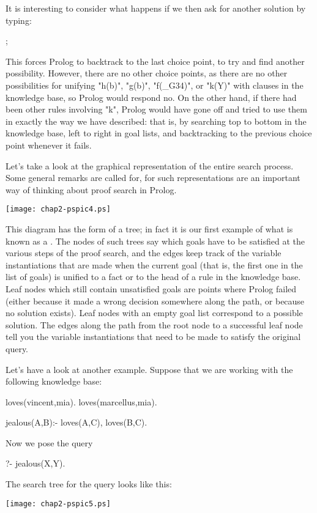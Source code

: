 It is interesting to consider what happens if we then ask for another
solution by typing:
\begin{LPNcodedisplay}
;
\end{LPNcodedisplay}
This forces Prolog to backtrack to the last choice point, to try and
find another possibility. However, there are no other choice points, as
there are no other possibilities for unifying "h(b)", "g(b)",
"f(\_G34)", or "k(Y)" with clauses in the knowledge base, so Prolog
would respond no.  On the other hand, if there had been other rules
involving "k", Prolog would have gone off and tried to use them in
exactly the way we have described: that is, by searching top to bottom
in the knowledge base, left to right in goal lists, and backtracking
to the previous choice point whenever it fails.


Let's take a look at the graphical representation of the entire search
process. Some general remarks are called for, for such representations
are an important way of thinking about proof search in Prolog.
%
\begin{center}
\texttt{[image: chap2-pspic4.ps]}
\end{center}
This diagram has the form of a tree; in fact it is our first example
of what is known as a .  The nodes of such trees
say which goals have to be satisfied at the various steps of the proof
search, and the edges keep track of the variable instantiations that
are made when the current goal (that is, the first one in the list of
goals) is unified to a fact or to the head of a rule in the knowledge
base.  Leaf nodes which still contain unsatisfied goals are points
where Prolog failed (either because it made a wrong decision somewhere
along the path, or because no solution exists). Leaf nodes with an
empty goal list correspond to a possible solution.  The edges along
the path from the root node to a successful leaf node tell you the
variable instantiations that need to be made to satisfy the original
query.

Let's have a look at another example. Suppose that we are working with
the following knowledge base:
\begin{LPNcodedisplay}
loves(vincent,mia).
loves(marcellus,mia).

jealous(A,B):- loves(A,C), loves(B,C).
\end{LPNcodedisplay}
%
Now we pose the query
\begin{LPNcodedisplay}
?- jealous(X,Y).
\end{LPNcodedisplay}
%
The search tree for the query looks like this:
%
\begin{center}
\texttt{[image: chap2-pspic5.ps]}
\end{center}


